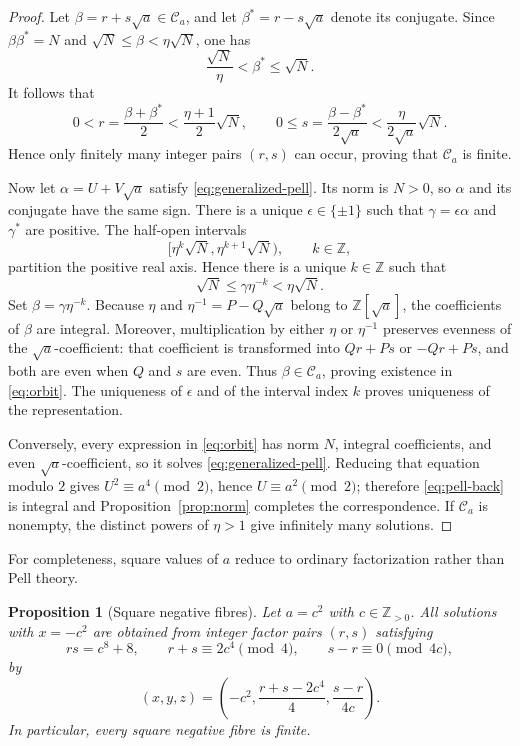 \documentclass[11pt]{article}
\newtheorem{proposition}[theorem]{Proposition}
\theoremstyle{remark}
\newcommand{\Z}{\mathbb Z}
\begin{document}
\begin{proof}
Let $\beta=r+s\sqrt a\in\mathcal C_a$, and let $\beta^*=r-s\sqrt a$ denote its conjugate.  Since $\beta\beta^*=N$ and $\sqrt N\le\beta<\eta\sqrt N$, one has
\[
 \frac{\sqrt N}{\eta}<\beta^*\le\sqrt N.
\]
It follows that
\[
 0<r=\frac{\beta+\beta^*}{2}<\frac{\eta+1}{2}\sqrt N,
 \qquad
 0\le s=\frac{\beta-\beta^*}{2\sqrt a}<\frac{\eta}{2\sqrt a}\sqrt N.
\]
Hence only finitely many integer pairs $(r,s)$ can occur, proving that $\mathcal C_a$ is finite.

Now let $\alpha=U+V\sqrt a$ satisfy \eqref{eq:generalized-pell}.  Its norm is $N>0$, so $\alpha$ and its conjugate have the same sign.  There is a unique $\epsilon\in\{\pm1\}$ such that $\gamma=\epsilon\alpha$ and $\gamma^*$ are positive.  The half-open intervals
\[
 [\eta^k\sqrt N,\eta^{k+1}\sqrt N),\qquad k\in\Z,
\]
partition the positive real axis.  Hence there is a unique $k\in\Z$ such that
\[
 \sqrt N\le\gamma\eta^{-k}<\eta\sqrt N.
\]
Set $\beta=\gamma\eta^{-k}$.  Because $\eta$ and $\eta^{-1}=P-Q\sqrt a$ belong to $\Z[\sqrt a]$, the coefficients of $\beta$ are integral.  Moreover, multiplication by either $\eta$ or $\eta^{-1}$ preserves evenness of the $\sqrt a$-coefficient: that coefficient is transformed into $Qr+Ps$ or $-Qr+Ps$, and both are even when $Q$ and $s$ are even.  Thus $\beta\in\mathcal C_a$, proving existence in \eqref{eq:orbit}.  The uniqueness of $\epsilon$ and of the interval index $k$ proves uniqueness of the representation.

Conversely, every expression in \eqref{eq:orbit} has norm $N$, integral coefficients, and even $\sqrt a$-coefficient, so it solves \eqref{eq:generalized-pell}.  Reducing that equation modulo $2$ gives $U^2\equiv a^4\pmod2$, hence $U\equiv a^2\pmod2$; therefore \eqref{eq:pell-back} is integral and Proposition~\ref{prop:norm} completes the correspondence.  If $\mathcal C_a$ is nonempty, the distinct powers of $\eta>1$ give infinitely many solutions.
\end{proof}

For completeness, square values of $a$ reduce to ordinary factorization rather than Pell theory.

\begin{proposition}[Square negative fibres]\label{prop:square-fibre}
Let $a=c^2$ with $c\in\Z_{>0}$.  All solutions with $x=-c^2$ are obtained from integer factor pairs $(r,s)$ satisfying
\begin{equation}\label{eq:factor-conditions}
 rs=c^8+8,
 \qquad r+s\equiv2c^4\pmod4,
 \qquad s-r\equiv0\pmod{4c},
\end{equation}
by
\begin{equation}\label{eq:factor-param}
 (x,y,z)=
 \left(
  -c^2,
  \frac{r+s-2c^4}{4},
  \frac{s-r}{4c}
 \right).
\end{equation}
In particular, every square negative fibre is finite.
\end{proposition}
\end{document}
